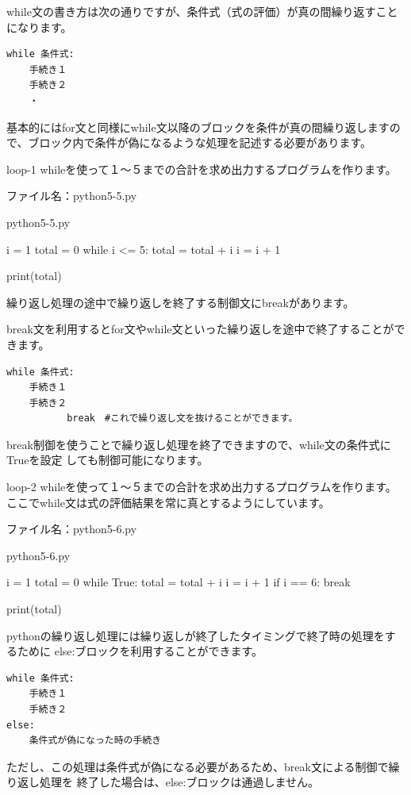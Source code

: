 \documentclass[11pt,a4paper,dvipdfmx,titlepage]{jsreport}
\begin{document}
while文の書き方は次の通りですが、条件式（式の評価）が真の間繰り返すことになります。
\begin{verbatim}
while 条件式:
    手続き１
    手続き２
    ・
\end{verbatim}
基本的にはfor文と同様にwhile文以降のブロックを条件が真の間繰り返しますので、ブロック内で条件が偽になるような処理を記述する必要があります。
\begin{pabox}{loop-1}
whileを使って１～５までの合計を求め出力するプログラムを作ります。

ファイル名：python5-5.py
\begin{codebox}{python5-5.py}
\begin{listing}{1}
i = 1
total = 0
while i <= 5:
    total = total + i
    i = i + 1

print(total)
\end{listing}
\end{codebox}
\end{pabox}
繰り返し処理の途中で繰り返しを終了する制御文にbreakがあります。

break文を利用するとfor文やwhile文といった繰り返しを途中で終了することができます。

\begin{verbatim}
while 条件式:
    手続き１
    手続き２
    　　　　break　#これで繰り返し文を抜けることができます。
\end{verbatim}

break制御を使うことで繰り返し処理を終了できますので、while文の条件式にTrueを設定
しても制御可能になります。
\begin{pabox}{loop-2}
whileを使って１～５までの合計を求め出力するプログラムを作ります。
ここでwhile文は式の評価結果を常に真とするようにしています。

ファイル名：python5-6.py
\begin{codebox}{python5-6.py}
\begin{listing}{1}
i = 1
total = 0
while True:
    total = total + i
    i = i + 1
    if i == 6:
        break

print(total)
\end{listing}
\end{codebox}
\end{pabox}

pythonの繰り返し処理には繰り返しが終了したタイミングで終了時の処理をするために
else:ブロックを利用することができます。

\begin{verbatim}
while 条件式:
    手続き１
    手続き２
else:
    条件式が偽になった時の手続き
\end{verbatim}
ただし、この処理は条件式が偽になる必要があるため、break文による制御で繰り返し処理を
終了した場合は、else:ブロックは通過しません。
\end{document}
